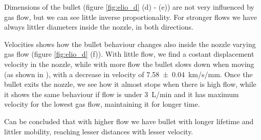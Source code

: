 Dimensions of the bullet (figure \ref{fig:elio_d} (d) - (e)) are not very  influenced by gas flow, but we can see little inverse proportionality. For stronger flows we have always littler diameters inside the nozzle, in both directions.

Velocities shows how the bullet behaviour changes also inside the nozzle varying gas flow (figure \ref{fig:elio_d} (f)). With little flow, we find a costant displacement velocity in the nozzle, while with more flow the bullet slows down when moving (as shown in \cite{Jarrige_2010}), with a decrease in velocity of \SI{7.58(4)}{\kilo\meter/\second/\milli\meter}.
Once the bullet exits the nozzle, we see how it almost stops when there is high flow, while it shows the same behaviour if flow is under \SI{3}{\liter/\minute} and it has maximum velocity for the lowest gas flow, maintaining it for longer time.


Can be concluded that with higher flow we have bullet with longer lifetime and littler mobility, reaching lesser distances with lesser velocity.


